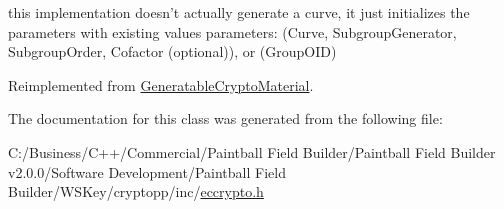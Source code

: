 this implementation doesn't actually generate a curve, it just initializes the parameters with existing values parameters: (Curve, SubgroupGenerator, SubgroupOrder, Cofactor (optional)), or (GroupOID) 

Reimplemented from \hyperlink{class_generatable_crypto_material_abe368b52db1ca7079b690f2d6e605f7a}{GeneratableCryptoMaterial}.

The documentation for this class was generated from the following file:\begin{DoxyCompactItemize}
\item 
C:/Business/C++/Commercial/Paintball Field Builder/Paintball Field Builder v2.0.0/Software Development/Paintball Field Builder/WSKey/cryptopp/inc/\hyperlink{eccrypto_8h}{eccrypto.h}\end{DoxyCompactItemize}
